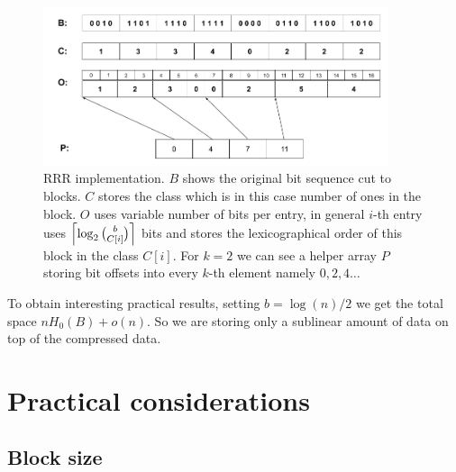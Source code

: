 \begin{figure}
	\centerline{
		\includegraphics[width=0.9\textwidth, height=0.3\textheight]{images/rrr}
	}
	\caption[TODO]{RRR implementation. $B$ shows the original bit sequence cut to
    blocks. $C$ stores the class which is in this case number of ones in the block.
    $O$ uses variable number of bits per entry, in general $i$-th entry uses
    $\left\lceil \log_2{b\choose C[i]} \right\rceil$ bits and stores the lexicographical order
    of this block in the class $C[i]$. For $k=2$ we can see a helper array $P$
    storing bit offsets into every $k$-th element namely $0, 2, 4\ldots$
	}
	\label{obr:RRRFinal}
\end{figure}

To obtain interesting practical results, setting $b=\log(n)/2$ we get the total space
$nH_0(B) + o(n)$. So we are storing only a sublinear amount of data on top of the compressed
data.

\section{Practical considerations}

\subsection{Block size}
\label{subsection:block_size}

